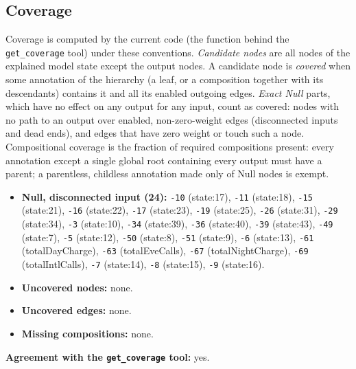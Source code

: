 \begin{drafted}
\subsection{Coverage}\label{app:churn100-s2-c1:coverage}
Coverage is computed by the current code (the function behind the \texttt{get\_coverage} tool) under these conventions. \emph{Candidate nodes} are all nodes of the explained model state except the output nodes. A candidate node is \emph{covered} when some annotation of the hierarchy (a leaf, or a composition together with its descendants) contains it and all its enabled outgoing edges. \emph{Exact Null} parts, which have no effect on any output for any input, count as covered: nodes with no path to an output over enabled, non-zero-weight edges (disconnected inputs and dead ends), and edges that have zero weight or touch such a node. Compositional coverage is the fraction of required compositions present: every annotation except a single global root containing every output must have a parent; a parentless, childless annotation made only of Null nodes is exempt.

\begin{itemize}
\item \textbf{Null, disconnected input (24):} \texttt{-10} (state:17), \texttt{-11} (state:18), \texttt{-15} (state:21), \texttt{-16} (state:22), \texttt{-17} (state:23), \texttt{-19} (state:25), \texttt{-26} (state:31), \texttt{-29} (state:34), \texttt{-3} (state:10), \texttt{-34} (state:39), \texttt{-36} (state:40), \texttt{-39} (state:43), \texttt{-49} (state:7), \texttt{-5} (state:12), \texttt{-50} (state:8), \texttt{-51} (state:9), \texttt{-6} (state:13), \texttt{-61} (totalDayCharge), \texttt{-63} (totalEveCalls), \texttt{-67} (totalNightCharge), \texttt{-69} (totalIntlCalls), \texttt{-7} (state:14), \texttt{-8} (state:15), \texttt{-9} (state:16).
\item \textbf{Uncovered nodes:} none.
\item \textbf{Uncovered edges:} none.
\item \textbf{Missing compositions:} none.
\end{itemize}
\noindent\textbf{Agreement with the \texttt{get\_coverage} tool:} yes.


\end{drafted}
